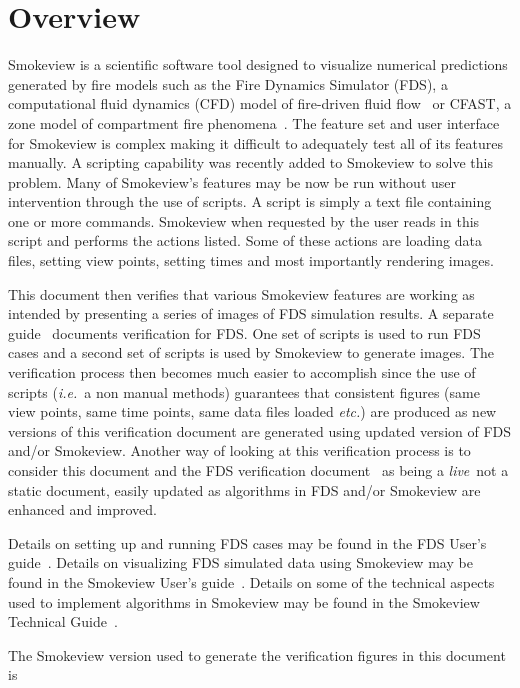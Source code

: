 \documentclass[11pt,twoside]{book}
\begin{document}
\chapter{Overview}
Smokeview is a scientific software tool designed to visualize numerical
predictions generated by fire models such as the Fire Dynamics Simulator (FDS),
a computational fluid dynamics (CFD) model of fire-driven fluid
flow~\cite{FDS_Tech_Guide_5} or CFAST, a zone model of compartment fire phenomena~\cite{Jones:2004A}.
The feature set and user interface for Smokeview is complex making it difficult to adequately test all of its features manually.  A scripting capability was recently added to Smokeview to solve this problem.  Many of Smokeview's features may be now be run without user intervention through the use of scripts.  A script is simply a text file containing one or more commands.  Smokeview when requested by the user reads in this script and performs the actions listed.  Some of these actions are loading data files, setting view points, setting times and most importantly rendering images.

This document then verifies that various Smokeview features are working as intended by presenting a series of  images of FDS simulation results.  A separate guide~\cite{FDS_Verification_Guide_5} documents verification for FDS.  One set of scripts is used to run FDS cases and a second set of scripts is used by Smokeview to generate images.  The verification process then becomes much easier to accomplish since the use of scripts ({\em i.e.}\ a non manual methods) guarantees that consistent figures (same view points, same time points, same data files loaded {\em etc.}) are produced as new versions of this verification document are generated using updated version of FDS and/or Smokeview.  Another way of looking at this verification process is to
consider this document and the FDS verification document~\cite{FDS_Verification_Guide_5} as being a {\em live}\ not a static document, easily updated as algorithms in FDS and/or Smokeview are enhanced and improved.

Details on setting up and
running FDS cases may be found in the FDS User's
guide~\cite{FDS_Users_Guide_5}.  Details on visualizing FDS simulated data using Smokeview may
be found in the Smokeview User's guide~\cite{Smokeview_Users_Guide_5}.  Details on some of the technical
aspects used to implement algorithms in Smokeview may be found in the Smokeview Technical Guide~\cite{Smokeview_Tech_Guide_5}.

The Smokeview version used to generate the verification figures in this document is
{

}
\end{document}
